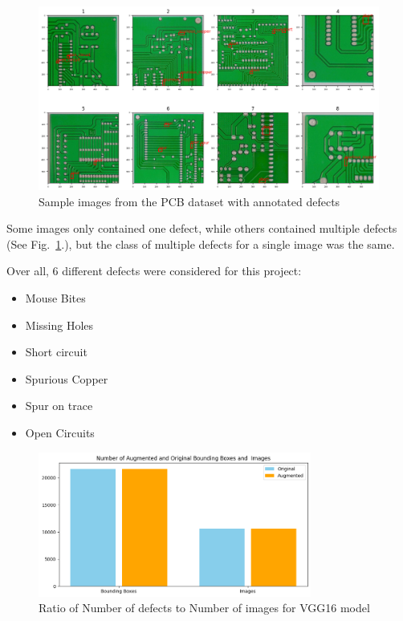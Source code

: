 \documentclass[12pt]{article}
\begin{document}
\begin{figure}[h]
    \centering
    \includegraphics[width=1\textwidth]{./graphics/4.png}
    \caption{Sample images from the PCB dataset with annotated defects}
    \label{fig:sample_pcb_dataset}
\end{figure}

Some images only contained one defect, while others contained multiple defects (See Fig.~\ref{fig:sample_pcb_dataset}.), but the class of multiple defects for a single image was the same.

Over all, 6 different defects were considered for this project:
\begin{itemize}
    \item Mouse Bites
    \item Missing Holes
    \item Short circuit
    \item Spurious Copper
    \item Spur on trace
    \item Open Circuits
\end{itemize}
\begin{figure}[h]
    \centering
    \includegraphics[width=0.8\textwidth]{./graphics/2.png}
    \caption{Ratio of Number of defects to Number of images for VGG16 model}
    \label{fig:ratio_dataset_vgg16}
\end{figure}
\end{document}
